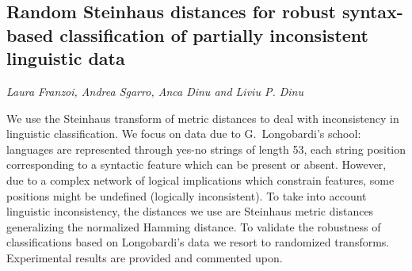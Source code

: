 \documentclass[../booklet.tex]{subfiles}
\begin{document}
\subsection[Random Steinhaus distances for robust syntax-based classification of partially inconsistent linguistic data. {\it Laura Franzoi, Andrea Sgarro, Anca Dinu and Liviu P. Dinu}]{Random Steinhaus distances for robust syntax-based classification of partially inconsistent linguistic data}
   

\begin{center}
  {\it Laura Franzoi, Andrea Sgarro, Anca Dinu and Liviu P. Dinu}
\end{center}



We use the Steinhaus transform of metric distances to deal with inconsistency in linguistic classification.  We focus on data due to G.\ Longobardi's school: languages are represented through yes-no strings of length 53, each string position corresponding to a syntactic feature which can be present or absent. However, due to a complex network of logical implications which constrain features, some positions might be undefined (logically inconsistent). To take into account linguistic inconsistency, the distances we use are Steinhaus metric distances generalizing the normalized Hamming distance. To validate the robustness of classifications based on Longobardi's data we resort to randomized transforms. Experimental results are provided and commented upon.

\end{document}
